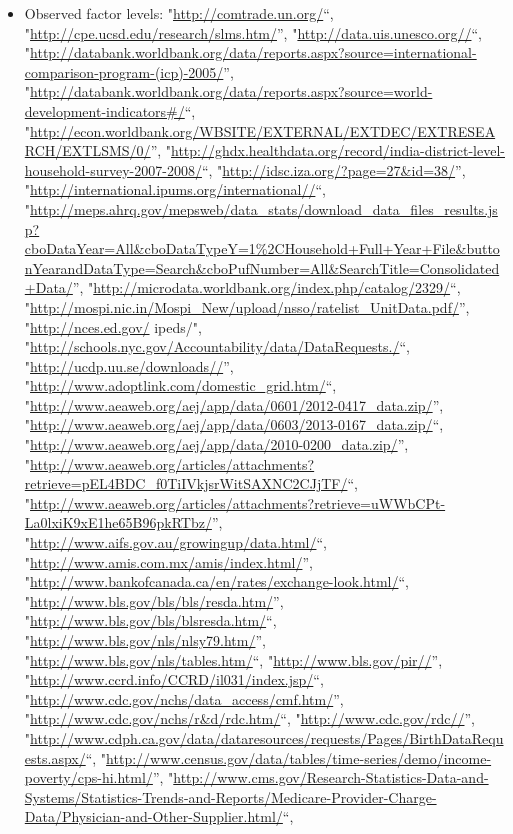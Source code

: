 \documentclass[]{article}
\providecommand{\tightlist}{%
  \setlength{\itemsep}{0pt}\setlength{\parskip}{0pt}}
\begin{document}
\begin{itemize}
\tightlist
\item
  Observed factor levels: "\url{http://comtrade.un.org/}``,
  "\url{http://cpe.ucsd.edu/research/slms.htm/}'',
  "\url{http://data.uis.unesco.org//}``,
  "\url{http://databank.worldbank.org/data/reports.aspx?source=international-comparison-program-(icp)-2005/}'',
  "\url{http://databank.worldbank.org/data/reports.aspx?source=world-development-indicators\#/}``,
  "\url{http://econ.worldbank.org/WBSITE/EXTERNAL/EXTDEC/EXTRESEARCH/EXTLSMS/0/}'',
  "\url{http://ghdx.healthdata.org/record/india-district-level-household-survey-2007-2008/}``,
  "\url{http://idsc.iza.org/?page=27\&id=38/}'',
  "\url{http://international.ipums.org/international//}``,
  "\url{http://meps.ahrq.gov/mepsweb/data_stats/download_data_files_results.jsp?cboDataYear=All\&cboDataTypeY=1\%2CHousehold+Full+Year+File\&buttonYearandDataType=Search\&cboPufNumber=All\&SearchTitle=Consolidated+Data/}'',
  "\url{http://microdata.worldbank.org/index.php/catalog/2329/}``,
  "\url{http://mospi.nic.in/Mospi_New/upload/nsso/ratelist_UnitData.pdf/}'',
  "\url{http://nces.ed.gov/} ipeds/",
  "\url{http://schools.nyc.gov/Accountability/data/DataRequests./}``,
  "\url{http://ucdp.uu.se/downloads//}'',
  "\url{http://www.adoptlink.com/domestic_grid.htm/}``,
  "\url{http://www.aeaweb.org/aej/app/data/0601/2012-0417_data.zip/}'',
  "\url{http://www.aeaweb.org/aej/app/data/0603/2013-0167_data.zip/}``,
  "\url{http://www.aeaweb.org/aej/app/data/2010-0200_data.zip/}'',
  "\url{http://www.aeaweb.org/articles/attachments?retrieve=pEL4BDC_f0TiIVkjsrWitSAXNC2CJjTF/}``,
  "\url{http://www.aeaweb.org/articles/attachments?retrieve=uWWbCPt-La0lxiK9xE1he65B96pkRTbz/}'',
  "\url{http://www.aifs.gov.au/growingup/data.html/}``,
  "\url{http://www.amis.com.mx/amis/index.html/}'',
  "\url{http://www.bankofcanada.ca/en/rates/exchange-look.html/}``,
  "\url{http://www.bls.gov/bls/bls/resda.htm/}'',
  "\url{http://www.bls.gov/bls/blsresda.htm/}``,
  "\url{http://www.bls.gov/nls/nlsy79.htm/}'',
  "\url{http://www.bls.gov/nls/tables.htm/}``,
  "\url{http://www.bls.gov/pir//}'',
  "\url{http://www.ccrd.info/CCRD/il031/index.jsp/}``,
  "\url{http://www.cdc.gov/nchs/data_access/cmf.htm/}'',
  "\url{http://www.cdc.gov/nchs/r\&d/rdc.htm/}``,
  "\url{http://www.cdc.gov/rdc//}'',
  "\url{http://www.cdph.ca.gov/data/dataresources/requests/Pages/BirthDataRequests.aspx/}``,
  "\url{http://www.census.gov/data/tables/time-series/demo/income-poverty/cps-hi.html/}'',
  "\url{http://www.cms.gov/Research-Statistics-Data-and-Systems/Statistics-Trends-and-Reports/Medicare-Provider-Charge-Data/Physician-and-Other-Supplier.html/}``,

\end{itemize}
\end{document}
